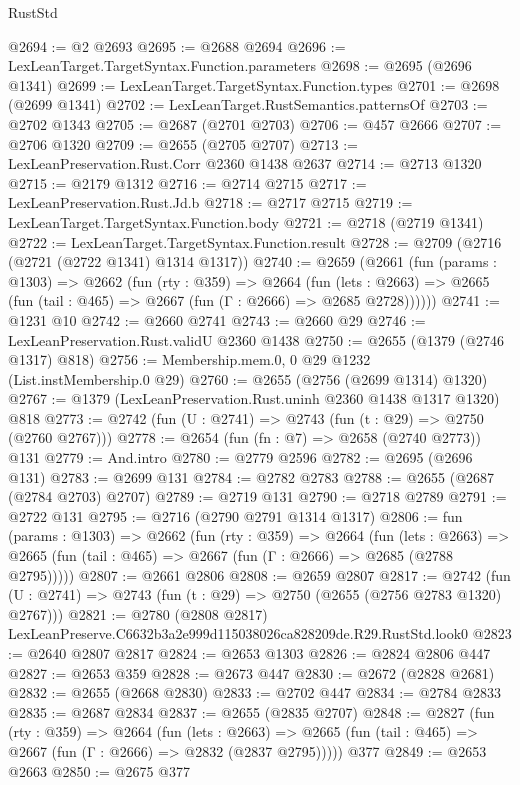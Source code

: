 \begin{lexlean}{RustStd}
\begin{coremodule}
@2694 := @2 @2693
@2695 := @2688 @2694
@2696 := LexLeanTarget.TargetSyntax.Function.parameters
@2698 := @2695 (@2696 @1341)
@2699 := LexLeanTarget.TargetSyntax.Function.types
@2701 := @2698 (@2699 @1341)
@2702 := LexLeanTarget.RustSemantics.patternsOf
@2703 := @2702 @1343
@2705 := @2687 (@2701 @2703)
@2706 := @457 @2666
@2707 := @2706 @1320
@2709 := @2655 (@2705 @2707)
@2713 := LexLeanPreservation.Rust.Corr @2360 @1438 @2637
@2714 := @2713 @1320
@2715 := @2179 @1312
@2716 := @2714 @2715
@2717 := LexLeanPreservation.Rust.Jd.b
@2718 := @2717 @2715
@2719 := LexLeanTarget.TargetSyntax.Function.body
@2721 := @2718 (@2719 @1341)
@2722 := LexLeanTarget.TargetSyntax.Function.result
@2728 := @2709 (@2716 (@2721 (@2722 @1341) @1314 @1317))
@2740 := @2659
    (@2661
      (fun (params : @1303) =>
      @2662
        (fun (rty : @359) =>
        @2664
          (fun (lets : @2663) =>
          @2665 (fun (tail : @465) => @2667 (fun (Γ : @2666) => @2685 @2728))))))
@2741 := @1231 @10
@2742 := @2660 @2741
@2743 := @2660 @29
@2746 := LexLeanPreservation.Rust.validU @2360 @1438
@2750 := @2655 (@1379 (@2746 @1317) @818)
@2756 := Membership.mem.{0, 0} @29 @1232 (List.instMembership.{0} @29)
@2760 := @2655 (@2756 (@2699 @1314) @1320)
@2767 := @1379 (LexLeanPreservation.Rust.uninh @2360 @1438 @1317 @1320) @818
@2773 := @2742 (fun (U : @2741) => @2743 (fun (t : @29) => @2750 (@2760 @2767)))
@2778 := @2654 (fun (fn : @7) => @2658 (@2740 @2773)) @131
@2779 := And.intro
@2780 := @2779 @2596
@2782 := @2695 (@2696 @131)
@2783 := @2699 @131
@2784 := @2782 @2783
@2788 := @2655 (@2687 (@2784 @2703) @2707)
@2789 := @2719 @131
@2790 := @2718 @2789
@2791 := @2722 @131
@2795 := @2716 (@2790 @2791 @1314 @1317)
@2806 := fun (params : @1303) =>
  @2662
    (fun (rty : @359) =>
    @2664
      (fun (lets : @2663) =>
      @2665 (fun (tail : @465) => @2667 (fun (Γ : @2666) => @2685 (@2788 @2795)))))
@2807 := @2661 @2806
@2808 := @2659 @2807
@2817 := @2742 (fun (U : @2741) => @2743 (fun (t : @29) => @2750 (@2655 (@2756 @2783 @1320) @2767)))
@2821 := @2780 (@2808 @2817) LexLeanPreserve.C6632b3a2e999d115038026ca828209de.R29.RustStd.look0
@2823 := @2640 @2807 @2817
@2824 := @2653 @1303
@2826 := @2824 @2806 @447
@2827 := @2653 @359
@2828 := @2673 @447
@2830 := @2672 (@2828 @2681)
@2832 := @2655 (@2668 @2830)
@2833 := @2702 @447
@2834 := @2784 @2833
@2835 := @2687 @2834
@2837 := @2655 (@2835 @2707)
@2848 := @2827
    (fun (rty : @359) =>
    @2664
      (fun (lets : @2663) =>
      @2665 (fun (tail : @465) => @2667 (fun (Γ : @2666) => @2832 (@2837 @2795)))))
    @377
@2849 := @2653 @2663
@2850 := @2675 @377

\end{coremodule}
\end{lexlean}
